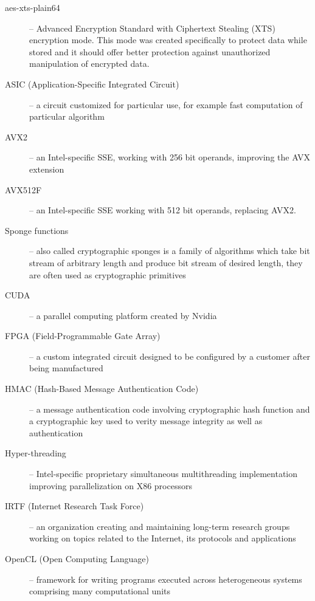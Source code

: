 \documentclass[nolof,digital]{fithesis3}
\begin{document}
\begin{description}
\item[aes-xts-plain64] -- Advanced Encryption Standard with Ciphertext Stealing (XTS) encryption mode. This mode was created specifically to protect data while stored and it should offer better protection against unauthorized manipulation of encrypted data.

\item[ASIC (Application-Specific Integrated Circuit)] -- a circuit customized for particular use, for example fast computation of particular algorithm

\item[AVX2] -- an Intel-specific SSE, working with 256 bit operands, improving the AVX extension

\item[AVX512F] -- an Intel-specific SSE working with 512 bit operands, replacing AVX2. 

\item[Sponge functions] -- also called cryptographic sponges is a family of algorithms which take bit stream of arbitrary length and produce bit stream of desired length, they are often used  as cryptographic primitives

\item[CUDA] -- a parallel computing platform created by Nvidia

\item[FPGA (Field-Programmable Gate Array)] -- a custom integrated circuit designed to be configured by a customer after being manufactured

\item[HMAC (Hash-Based Message Authentication Code)] -- a message authentication code involving cryptographic hash function and a cryptographic key used to verity message integrity as well as authentication

\item[Hyper-threading] -- Intel-specific proprietary simultaneous multithreading implementation improving parallelization on X86 processors

\item[IRTF (Internet Research Task Force)] -- an organization creating and maintaining long-term research groups working on topics related to the Internet, its protocols and applications

\item[OpenCL (Open Computing Language)] -- framework for writing programs executed across heterogeneous systems comprising many computational units


\end{description}
\end{document}
